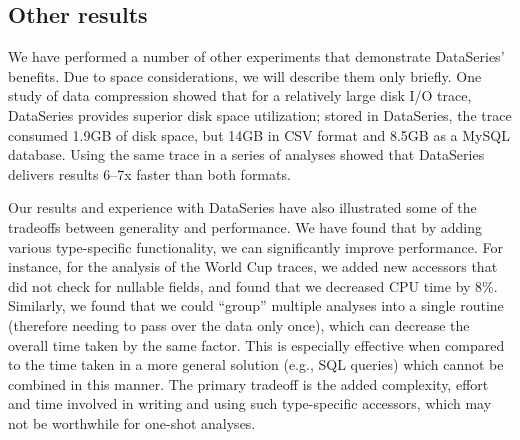 \documentclass{acm_proc_article-sp}
\newcommand{\fix}[1]{{\LARGE\ensuremath{\bullet}}\textbf{#1}}
\begin{document}


\subsection{Other results}\label{sec:otherresults}

We have performed a number of other experiments that demonstrate
DataSeries' benefits. Due to space considerations, we will describe them only 
briefly. One study of data compression showed that for a
relatively large disk I/O trace, DataSeries provides superior disk
space utilization; stored in DataSeries, the trace consumed 1.9GB of
disk space, but 14GB in CSV format and 8.5GB as a MySQL
database. Using the same trace in a series of analyses showed that
DataSeries delivers results 6--7x faster than both formats.

Our results and experience with DataSeries have also illustrated some
of the tradeoffs between generality and performance. We have found
that by adding various type-specific functionality, we can
significantly improve performance. For instance, for the analysis of
the World Cup traces, we added new accessors that did not check for
nullable fields, and found that we decreased CPU time by
8\%. Similarly, we found that we could ``group'' multiple analyses
into a single routine (therefore needing to pass over the data only
once), which can decrease the overall time taken by the same
factor. This is especially effective when compared to the time taken
in a more general solution (e.g., SQL queries) which cannot be combined
in this manner. The primary tradeoff is the added complexity, effort
and time involved in writing and using such type-specific
accessors, which may not be worthwhile for one-shot analyses.
\end{document}
